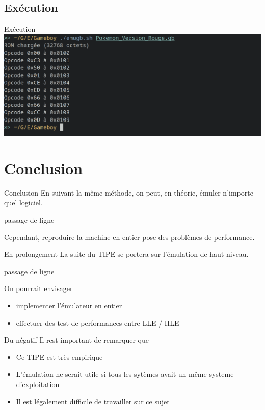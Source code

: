 \documentclass{beamer}
\begin{document}
    \subsection{Exécution}
    \begin{frame}{Exécution}
        \includegraphics[width=1\textwidth]{images/execution.png}
    \end{frame}

    \section{Conclusion}
    \begin{frame}{Conclusion}
        En suivant la même méthode, on peut, en théorie, émuler n'importe quel logiciel.

        {\color{white} passage de ligne}

        Cependant, reproduire la machine en entier pose des problèmes de performance.
    \end{frame}

    \begin{frame}{En prolongement}
        La suite du TIPE se portera sur l'émulation de haut niveau.

        {\color{white} passage de ligne}

        On pourrait envisager
        \begin{itemize}
            \item implementer l'émulateur en entier
            \item effectuer des test de performances entre LLE / HLE
        \end{itemize}
    \end{frame}

    \begin{frame}{Du négatif}
        Il rest important de remarquer que
        \begin{itemize}
            \item Ce TIPE est très empirique
            \item L'émulation ne serait utile si tous les sytèmes avait un même systeme d'exploitation
            \item Il est légalement difficile de travailler sur ce sujet
        \end{itemize}
    \end{frame}
\end{document}
